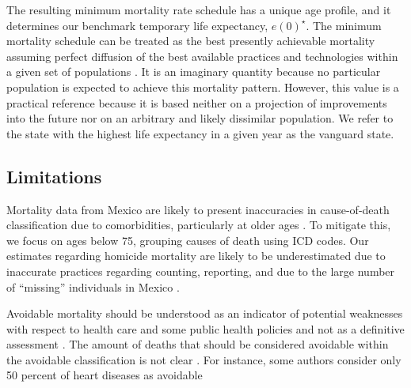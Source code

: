 \documentclass[11.5pt]{article}
\begin{document}
\begin{spacing}{1.5}

The resulting minimum mortality rate schedule has a unique age profile, and it determines our benchmark temporary life expectancy, $e(0)^\star$. The minimum mortality schedule can be treated as the best presently achievable mortality assuming perfect diffusion of the best available practices and technologies within a given set of populations \citep{vallin2008minimum}. It is an imaginary quantity because no particular population is expected to achieve this mortality pattern. However, this value is a practical reference because it is based neither on a projection of improvements into the future nor on an arbitrary and likely dissimilar population. We refer to the state with the highest life expectancy in a given year as the vanguard state.


\subsection*{Limitations}
Mortality data from Mexico are
likely to present inaccuracies in cause-of-death classification due to
comorbidities, particularly at older ages \citep{tobias2001}. To mitigate this,
we focus on ages below 75, grouping causes of death using ICD codes.
Our estimates regarding homicide mortality are likely to be
underestimated due to inaccurate practices regarding counting, reporting,
and due to the large number of ``missing'' individuals in Mexico \citep{HRW2011}.

Avoidable mortality should be understood as an indicator of potential
weaknesses with respect to health care and some public health policies and not
as a definitive assessment \citep{nolte&mckee2008}. The amount of deaths that should be considered avoidable within the avoidable classification is not clear \citep{beltran2011avoidable}. For instance, some authors consider only 50 percent of heart diseases as avoidable \citep{nolte2012amenable}


\end{spacing}
\end{document}
